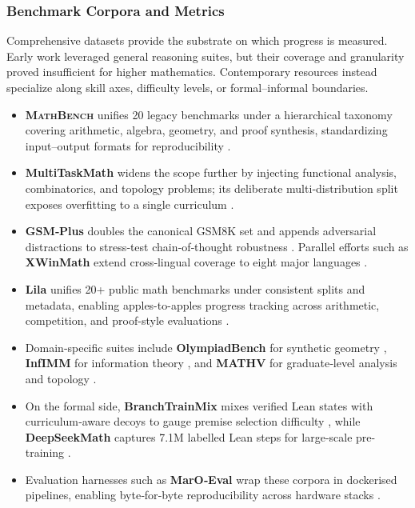 \documentclass[acmsmall,anonymous]{acmart}
\begin{document}
\subsubsection{Benchmark Corpora and Metrics}\label{sec:benchmarks}
Comprehensive datasets provide the substrate on which progress is measured.  Early work leveraged general reasoning suites, but their coverage and granularity proved insufficient for higher mathematics.  Contemporary resources instead specialize along skill axes, difficulty levels, or formal–informal boundaries.

\begin{itemize}
    \item \textbf{\textsc{MathBench}} unifies 20 legacy benchmarks under a hierarchical taxonomy covering arithmetic, algebra, geometry, and proof synthesis, standardizing input–output formats for reproducibility \cite{yang2024mathbench,mathbench2024}.  
    \item \textbf{MultiTaskMath} widens the scope further by injecting functional analysis, combinatorics, and topology problems; its deliberate multi‐distribution split exposes overfitting to a single curriculum \cite{bang2023multitask}.  
    \item \textbf{GSM‐Plus} doubles the canonical GSM8K set and appends adversarial distractions to stress‐test chain‐of‐thought robustness \cite{li2024gsmplus}.  Parallel efforts such as \textbf{XWinMath} extend cross‐lingual coverage to eight major languages \cite{li2024xwinmath}.  
    \item \textbf{Lila} unifies 20+ public math benchmarks under consistent splits and metadata, enabling apples-to-apples progress tracking across arithmetic, competition, and proof-style evaluations \cite{mishra-2023-lila}.  
    \item Domain‐specific suites include \textbf{OlympiadBench} for synthetic geometry \cite{he2024bolympiadbench}, \textbf{InfIMM} for information theory \cite{han2024infimm}, and \textbf{MATHV} for graduate‐level analysis and topology \cite{wang2024mathv}.  
    \item On the formal side, \textbf{BranchTrainMix} mixes verified Lean states with curriculum‐aware decoys to gauge premise selection difficulty \cite{wang2024branchtrainmix}, while \textbf{DeepSeekMath} captures 7.1M labelled Lean steps for large‐scale pre-training \cite{shao2024deepseekmath}.  
    \item Evaluation harnesses such as \textbf{MarO‐Eval} wrap these corpora in dockerised pipelines, enabling byte‐for‐byte reproducibility across hardware stacks \cite{zhang2024marioeval}.  

\end{itemize}
\end{document}

